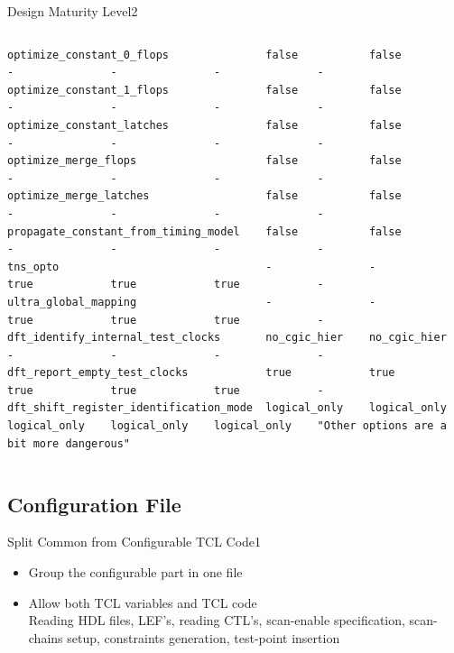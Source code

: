 \documentclass{beamer}
\begin{document}
\begin{frame}{Design Maturity Level}{2}
\begin{columns}
\begin{column}{1.1\textwidth}
\begin{verbatim}
optimize_constant_0_flops               false           false           -               -               -               -
optimize_constant_1_flops               false           false           -               -               -               -
optimize_constant_latches               false           false           -               -               -               -
optimize_merge_flops                    false           false           -               -               -               -
optimize_merge_latches                  false           false           -               -               -               -
propagate_constant_from_timing_model    false           false           -               -               -               -
tns_opto                                -               -               true            true            true            -
ultra_global_mapping                    -               -               true            true            true            -
dft_identify_internal_test_clocks       no_cgic_hier    no_cgic_hier    -               -               -               -
dft_report_empty_test_clocks            true            true            true            true            true            -
dft_shift_register_identification_mode  logical_only    logical_only    logical_only    logical_only    logical_only    "Other options are a bit more dangerous"
\end{verbatim}
\end{column}
\end{columns}
\end{frame}

\subsection{Configuration File}
\begin{frame}{Split Common from Configurable TCL Code}{1}
	\begin{itemize}[<+->]
	 \item Group the configurable part in one file
	 \item Allow both TCL variables and TCL code \\ Reading HDL files, LEF's, reading CTL's, scan-enable specification, scan-chains setup, constraints generation, test-point insertion
	\end{itemize}
\end{frame}
\end{document}
